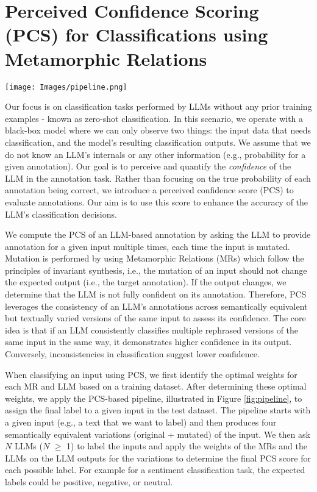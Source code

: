 \section{Perceived Confidence Scoring (PCS) for Classifications using Metamorphic Relations}\label{pcs-methodology}

\begin{figure*}[t]
\vskip 0.2in
\begin{center}
{
\texttt{[image: Images/pipeline.png]}

\caption{Overview of the classification pipeline using Perceived Confidence Score  (PCS) Annotator.}
\label{fig:pipeline}}
\end{center}
\vskip -0.2in
\end{figure*}

Our focus is on classification tasks performed by LLMs without any prior training examples - known as zero-shot classification. In this scenario, we operate with a black-box model where we can only observe two things: the input data that needs classification, and the model's resulting classification outputs. We assume that we do not know an LLM's internals or any other information (e.g., probability for a given annotation). Our goal is to perceive and quantify the \textit{confidence} of the LLM in the annotation task. Rather than focusing on the true probability of each annotation being correct, we introduce a perceived confidence score (PCS) to evaluate annotations. Our aim is to use this score to enhance the accuracy of the LLM's classification decisions.

We compute the PCS of an LLM-based annotation by asking the LLM to provide annotation for a given input multiple times, each time the input is mutated. Mutation is performed by using Metamorphic Relations (MRs) which follow the principles of invariant synthesis, i.e., the mutation of an input should not change the expected output (i.e., the target annotation). If the output changes, we determine that the LLM is not fully confident on its annotation. Therefore, PCS leverages the consistency of an LLM's annotations across semantically equivalent but textually varied versions of the same input to assess its confidence. The core idea is that if an LLM consistently classifies multiple rephrased versions of the same input in the same way, it demonstrates higher confidence in its output. Conversely, inconsistencies in classification suggest lower confidence.

When classifying an input using PCS, we first identify the optimal weights for each MR and LLM based on a training dataset. After determining these optimal weights, we apply the PCS-based pipeline, illustrated in Figure \ref{fig:pipeline}, to assign the final label to a given input in the test dataset. The pipeline starts with a given input (e.g., a text that we want to label) and then produces four semantically equivalent variations (original + mutated) of the input. We then ask $N$ LLMs ($N$ $\ge$ 1) to label the inputs and apply the weights of the MRs and the LLMs on the LLM outputs for the variations to determine the final PCS score for each possible label. For example for a sentiment classification task, the expected labels could be positive, negative, or neutral.

